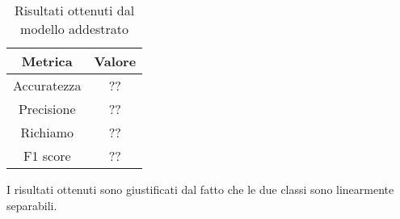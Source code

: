 \begin{table}[h]
    \centering
    \begin{tabular}{|c|c|}
        \hline
        \textbf{Metrica} & \textbf{Valore} \\
        \hline
        Accuratezza & ?? \\
        \hline
        Precisione & ?? \\
        \hline
        Richiamo & ?? \\
        \hline
        F1 score & ?? \\
        \hline
    \end{tabular}
    \caption{Risultati ottenuti dal modello addestrato}
    \label{tab:risultatiReteNeurale}
\end{table}

I risultati ottenuti sono giustificati dal fatto che le due classi sono linearmente
separabili.


